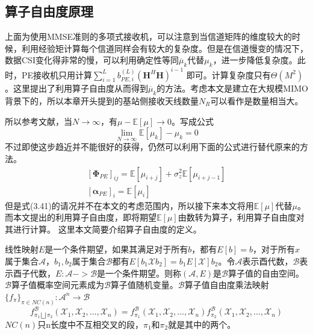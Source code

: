 \documentclass[bachelor,nocolorlinks, printoneside]{seuthesis} %
\begin{document}
\begin{Main}
\section{算子自由度原理}
上面为使用MMSE准则的多项式接收机，可以注意到当信道矩阵的维度较大的时候，利用经验矩计算每个信道同样会有较大的复杂度。但是在信道慢变的情况下，数据CSI变化得非常的慢，可以利用确定性等同$\overline{\mu}_k$代替$\mu_k$，进一步降低复杂度。此时，PE接收机只用计算$\sum_{i=1}^{L} b_{PE,i}^{(L)}(\mathbf{H}^H\mathbf{H})^{i-1}$ 即可。计算复杂度只有$\Theta(M^2)$。这里提出了利用算子自由度从而得到$\overline{\mu}_k$的方法。考虑本文是建立在大规模MIMO背景下的，所以本章开头提到的基站侧接收天线数量$N_R$可以看作是数量相当大。

所以参考文献，当$N \rightarrow \infty$，有$\mu - \mathbb{E}[\mu] \rightarrow 0$。写成公式
\begin{equation}\label{key}
\lim_{N \rightarrow \infty} \mathbb{E}[\mu_k] -\mu_k =0
\end{equation}
不过即使这步趋近并不能很好的获得，仍然可以利用下面的公式进行替代原来的方法。
\begin{gather}\label{key}
[\mathbf{\Phi}_{PE}]_{ij} = \mathbb{E}[\mu_{i+j}] + \sigma_{z}^2 \mathbb{E}[\mu_{i+j-1}] \nonumber \\
\left[\mathbf{\alpha}_{PE}\right]_i = \mathbb{E}[\mu_i]
\end{gather}
但是式(3.41)的请况并不在本文的考虑范围内，所以接下来本文将用$\mathbb{E}[\mu]$代替$\mu$。而本文提出的利用算子自由度，即将期望$\mathbb{E}[\mu]$由数转为算子，利用算子自由度对其进行计算。
这里本文简要介绍算子自由度的定义。

线性映射$E$是一个条件期望，如果其满足对于所有$b$，都有$E[b]=b$，对于所有$x$属于集合$\mathcal{A}$，$b_1,b_2$属于集合$\mathcal{B}$都有$E[b_1\mathcal{X}b_2]= b_1E[\mathcal{X}]b_2$。令$\mathcal{A}$表示酉代数，$\mathcal{B}$表示酉子代数，$E:\mathcal{A}->\mathcal{B}$是一个条件期望。则称$(\mathcal{A},E)$是$\mathcal{B}$算子值的自由空间。$\mathcal{B}$算子值概率空间元素成为$\mathcal{B}$算子值随机变量。$\mathcal{B}$算子值自由度乘法映射$\lbrace f_{\pi} \rbrace _{\pi \in NC(n)}:\mathcal{A}^n \rightarrow \mathcal{B}$
\begin{equation}\label{key}
f_{\pi_1 \bigsqcup \pi_2}^{\mathcal{B}}(\mathcal{X}_1,\mathcal{X}_2,...,\mathcal{X}_n) = f_{\pi_1}^{\mathcal{B}}(\mathcal{X}_1,\mathcal{X}_2,...,\mathcal{X}_n)f_{\pi_2}^{\mathcal{B}}(\mathcal{X}_1,\mathcal{X}_2,...,\mathcal{X}_n)
\end{equation}
$NC(n)$只n长度中不互相交叉的段，$\pi_1$和$\pi_2$就是其中的两个。


\end{Main}
\end{document}
